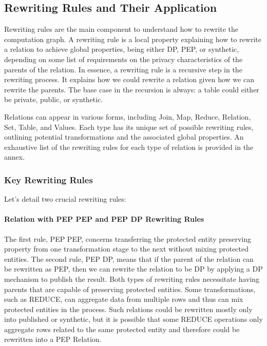 \documentclass[letterpaper]{article} %
\begin{document}

\subsection{Rewriting Rules and Their Application}

Rewriting rules are the main component to understand how to rewrite the computation graph. A rewriting rule is a local property explaining how to rewrite a relation to achieve global properties, being either DP, PEP, or synthetic, depending on some list of requirements on the privacy characteristics of the parents of the relation. In essence, a rewriting rule is a recursive step in the rewriting process. It explains how we could rewrite a relation given how we can rewrite the parents. The base case in the recursion is always: a table could either be private, public, or synthetic.

Relations can appear in various forms, including Join, Map, Reduce, Relation, Set, Table, and Values. Each type has its unique set of possible rewriting rules, outlining potential transformations and the associated global properties. An exhaustive list of the rewriting rules for each type of relation is provided in the annex.

\subsubsection{Key Rewriting Rules}

Let’s detail two crucial rewriting rules:

\paragraph{Relation with PEP \textrightarrow{} PEP and PEP \textrightarrow{} DP Rewriting Rules}
The first rule, PEP \textrightarrow{} PEP, concerns transferring the protected entity preserving property from one transformation stage to the next without mixing protected entities. The second rule, PEP \textrightarrow{} DP, means that if the parent of the relation can be rewritten as PEP, then we can rewrite the relation to be DP by applying a DP mechanism to publish the result. Both types of rewriting rules necessitate having parents that are capable of preserving protected entities. Some transformations, such as REDUCE, can aggregate data from multiple rows and thus can mix protected entities in the process. Such relations could be rewritten mostly only into published or synthetic, but it is possible that some REDUCE operations only aggregate rows related to the same protected entity and therefore could be rewritten into a PEP Relation.
\end{document}
